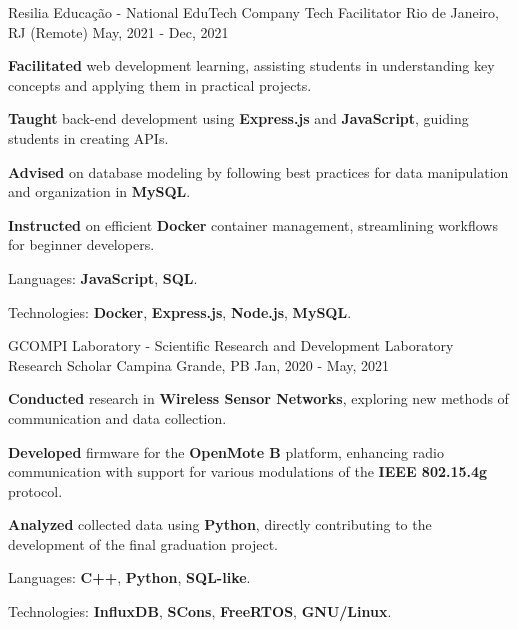 \begin{cventries}
  \cventry
  {Resilia Educação - National EduTech Company} %
  {Tech Facilitator} %
  {Rio de Janeiro, RJ (Remote)} %
  {May, 2021 - Dec, 2021} %
  {
    \begin{cvitems}
      \item {\textbf{Facilitated} web development learning, assisting students in understanding key concepts and applying them in practical projects.}
      \item {\textbf{Taught} back-end development using \textbf{Express.js} and \textbf{JavaScript}, guiding students in creating APIs.}
      \item {\textbf{Advised} on database modeling by following best practices for data manipulation and organization in \textbf{MySQL}.}
      \item {\textbf{Instructed} on efficient \textbf{Docker} container management, streamlining workflows for beginner developers.}
      \item {Languages: \textbf{JavaScript}, \textbf{SQL}.}
      \item {Technologies: \textbf{Docker}, \textbf{Express.js}, \textbf{Node.js}, \textbf{MySQL}.}
    \end{cvitems}
  }

  \cventry
  {GCOMPI Laboratory - Scientific Research and Development Laboratory} %
  {Research Scholar} %
  {Campina Grande, PB} %
  {Jan, 2020 - May, 2021} %
  {
    \begin{cvitems}
      \item {\textbf{Conducted} research in \textbf{Wireless Sensor Networks}, exploring new methods of communication and data collection.}
      \item {\textbf{Developed} firmware for the \textbf{OpenMote B} platform, enhancing radio communication with support for various modulations of the \textbf{IEEE 802.15.4g} protocol.}
      \item {\textbf{Analyzed} collected data using \textbf{Python}, directly contributing to the development of the final graduation project.}
      \item {Languages: \textbf{C++}, \textbf{Python}, \textbf{SQL-like}.}
      \item {Technologies: \textbf{InfluxDB}, \textbf{SCons}, \textbf{FreeRTOS}, \textbf{GNU/Linux}.}
    \end{cvitems}
  }
\end{cventries}
